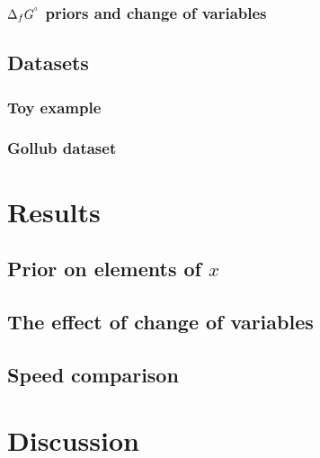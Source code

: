 \documentclass[10pt,letterpaper]{article}
\newcommand{\sdgf}{\Delta_fG^{\degree}}
\begin{document}
\subsubsection{$\sdgf$ priors and change of variables}



\subsubsection{}

\subsection{Datasets}

\subsubsection{Toy example}

\subsubsection{Gollub dataset}

\section*{Results}

\subsection{Prior on elements of $x$}
\label{sec:x_prior}

\subsection{The effect of change of variables}

\subsection{Speed comparison}

\subsection{}

\section*{Discussion}
\end{document}
